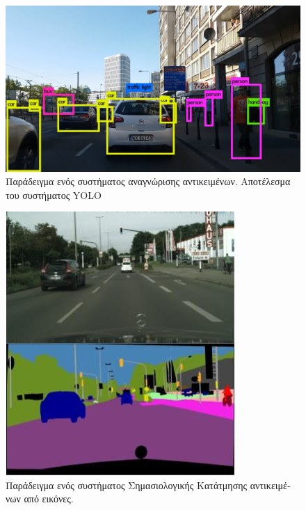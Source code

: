 \begin{figure}[h!]
\centering
\includegraphics[scale=0.3]{Images/Obj_det}
\caption[\textgreek{Αναγνώριση} YOLO]{\textgreek{Παράδειγμα ενός συστήματος αναγνώρισης αντικειμένων. Αποτέλεσμα του συστήματος }YOLO \cite{yolo}}
\label{fig:yolo_img}
\end{figure}

\begin{figure}[h!]
\centering
\includegraphics{Images/seg}
\caption[\textgreek{Παράδειγμα Σημασιολογίας}]{\textgreek{Παράδειγμα ενός συστήματος Σημασιολογικής Κατάτμησης αντικειμένων από εικόνες.}}
\label{fig:seg_img}
\end{figure}

